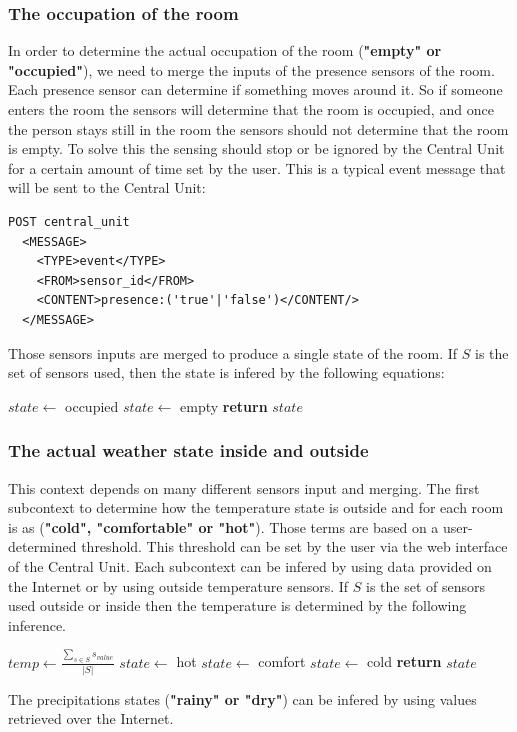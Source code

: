 \documentclass{acm_proc_article-sp}
\begin{document}
 \subsubsection*{The occupation of the room}
 In order to determine the actual occupation of the room (\textbf{"empty" or "occupied"}), we need to merge the inputs of the presence sensors of the room.
 Each presence sensor can determine if something moves around it. 
 So if someone enters the room the sensors will determine that the room is occupied, and once the person stays still in the room the sensors should not determine that the room is empty. 
 To solve this the sensing should stop or be ignored by the Central Unit for a certain amount of time set by the user.
 This is a typical event message that will be sent to the Central Unit:
 \begin{verbatim}
POST central_unit 
  <MESSAGE>
    <TYPE>event</TYPE>
    <FROM>sensor_id</FROM>
    <CONTENT>presence:('true'|'false')</CONTENT/>
  </MESSAGE> 
\end{verbatim}
Those sensors inputs are merged to produce a single state of the room.
If $S$ is the set of sensors used, then the state is infered by the following equations:
 \begin{description}
 \begin{algorithm}
  \begin{algorithmic}
      \State $state\gets$ occupied
    \Else
      \State $state\gets$ empty
  \EndIf
  \State \textbf{return} $state$
  \end{algorithmic}
  \end{algorithm}
 \end{description}
 \subsubsection*{The actual weather state inside and outside}
 This context depends on many different sensors input and merging.
 The first subcontext to determine how the temperature state is outside and for each room is as (\textbf{"cold", "comfortable" or "hot"}). 
 Those terms are based on a user-determined threshold. This threshold can be set by the user via the web interface of the Central Unit.
 Each subcontext can be infered by using data provided on the Internet or by using outside temperature sensors.
 If $S$ is the set of sensors used outside or inside then the temperature is determined by the following inference.
 \begin{description}
 \begin{algorithm}
  \begin{algorithmic}
  \State $temp\gets \frac{\underset{s \in S}{\sum} s_{value}}{|S|}$
    \State $state\gets$ hot
    \State $state\gets$ comfort
    \State $state\gets$ cold
   \EndIf
  \State \textbf{return} $state$
  \end{algorithmic}
  \end{algorithm}
  \end{description}
 The precipitations states (\textbf{"rainy" or "dry"}) can be infered by using values retrieved over the Internet.
\end{document}
